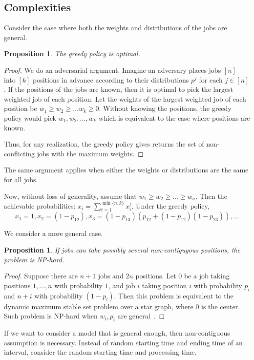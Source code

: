 \documentclass{article}
\newtheorem{proposition}[theorem]{Proposition}
\begin{document}
\subsection{Complexities}
Consider the case where both the weights and distributions of the jobs are general.
\begin{proposition}
    The greedy policy is optimal.
\end{proposition}
\begin{proof}
    We do an adversarial argument.
    Imagine an adversary places jobs $[n]$ into $[k]$ positions in advance according to their distributions $p^j$ for each $j\in[n]$.
    If the positions of the jobs are known, then it is optimal to pick the largest weighted job of each position.
    Let the weights of the largest weighted job of each position be $w_1\geq w_2\geq \ldots w_k\geq 0$.
    Without knowing the positions, the greedy policy would pick $w_1,w_2,\ldots, w_k$ which is equivalent to the case where positions are known.

    Thus, for any realization, the greedy policy gives returns the set of non-conflicting jobs with the maximum weights.
\end{proof}

The same argument applies when either the weights or distributions are the same for all jobs.

Now, without loss of generality, assume that $w_1\geq w_2\geq\ldots\geq w_n.$
Then the achievable probabilities:
$x_i = \sum_{t=1}^{\min\{n,k\}}x_i^t$.
 Under the greedy policy,
\[x_1 = 1, x_2 = (1-p_{12}), x_3 = (1-p_{13})(p_{12}+(1-p_{12})(1-p_{23})),\ldots\]


We consider a more general case.
\begin{proposition}
    If jobs can take possibly several non-contigugous positions, the problem is NP-hard.
\end{proposition}
\begin{proof}
    Suppose there are $n+1$ jobs and $2n$ positions.
    Let $0$ be a job taking positions $1,\ldots,n$ with probability $1$, and job $i$ taking position $i$ with probability $p_i$ and $n+i$ with probability $(1-p_i)$.
    Then this problem is equivalent to the dynamic maximum stable set problem over a star graph, where $0$ is the center.
    Such problem is NP-hard when $w_i,p_i$ are general~\cite{DNP}.
\end{proof}
If we want to consider a model that is general enough, then non-contiguous assumption is necessary.
Instead of random starting time and ending time of an interval, consider the random starting time and processing time.
\end{document}
